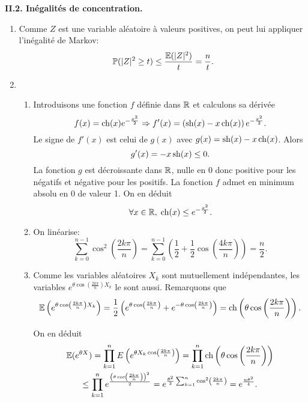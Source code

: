 \textbf{II.2. Inégalités de concentration.}
\begin{enumerate}
  \item Comme $Z$ est une variable aléatoire à valeurs positives, on peut lui appliquer l'inégalité de Markov:
\[
  \mathbb{P}(|Z|^2 \geq t) \leq \frac{\mathbb{E}(|Z|^2)}{t} = \frac{n}{t}.
\]

  \item 
  \begin{enumerate}
    \item Introduisons une fonction $f$ définie dans $\mathbb{R}$ et calculons sa dérivée 
\[
  f(x) = \operatorname{ch}(x) e^{-\frac{x^2}{2}}
  \Rightarrow 
  f'(x) = \left( \operatorname{sh}(x) - x\operatorname{ch}(x)\right)e^{-\frac{x^2}{2}}.
\]
Le signe de $f'(x)$ est celui de $g(x)$ avec $g(x) = \operatorname{sh}(x) - x\operatorname{ch}(x)$. Alors
\[
  g'(x) = -x \operatorname{sh}(x) \leq 0.
\]
La fonction $g$ est décroissante dans $\mathbb{R}$, nulle en $0$ donc positive pour les négatifs et négative pour les positifs. La fonction $f$ admet en minimum absolu en $0$ de valeur 1. On en déduit
\[
  \forall x \in \mathbb{R}, \; \operatorname{ch}(x) \leq e^{-\frac{x^2}{2}}.
\]

    \item On linéarise:
\[
  \sum_{k=0}^{n-1}\cos^2\left(\frac{2k\pi}{n} \right)
  =\sum_{k=0}^{n-1}\left( \frac{1}{2} + \frac{1}{2}\cos\left(\frac{4k\pi}{n} \right) \right)
  = \frac{n}{2}.
\]

    \item Comme les variables aléatoires $X_k$ sont mutuellement indépendantes, les variables $e^{\theta \cos \left( \frac{2k\pi}{n}\right) X_k}$ le sont aussi. Remarquons que 
\[
  \mathbb{E}\left(e^{\theta \cos \left( \frac{2k\pi}{n}\right) X_k}\right) 
  = \frac{1}{2}
  \left( 
      e^{\theta \cos \left( \frac{2k\pi}{n}\right)} 
    + e^{-\theta \cos \left( \frac{2k\pi}{n}\right)}
  \right)
  = \operatorname{ch} \left( \theta \cos \left( \frac{2k\pi}{n}\right)\right).
\]
    
    On en déduit
\begin{multline*}
  \mathbb{E}(e^{\theta X}) = \prod_{k=1}^{n} 
            E\left(
                   e^{\theta  X_k\cos\left( \frac{2k\pi}{n}\right)}
             \right)
  = \prod_{k=1}^{n} \operatorname{ch} \left( \theta \cos \left( \frac{2k\pi}{n}\right)\right)\\
  \leq \prod_{k=1}^{n} 
      e^{ \frac{
                \left(\theta \cos \left( \frac{2k\pi}{n}\right)\right)^2
               }{2}
        }
  = e^{
       \frac{\theta^2}{2}\sum_{k=1}^{n} \cos^2 \left( \frac{2k\pi}{n}\right)
      }
  = e^{\frac{n\theta^2}{4}}.
\end{multline*}


\end{enumerate}
\end{enumerate}
